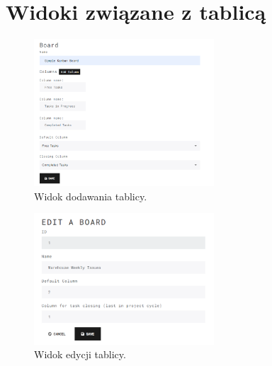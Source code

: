 \section{Widoki związane z tablicą}
\begin{figure}[h!]
	\centering
	\includegraphics[width=0.60\textwidth]{addboard}
	
	\caption{Widok dodawania tablicy.}
	\label{addb}
\end{figure}


\begin{figure}[h!]
	\centering
	\includegraphics[width=0.60\textwidth]{boardedit}
	
	\caption{Widok edycji tablicy.}
	\label{boardedit}
\end{figure}
\clearpage
